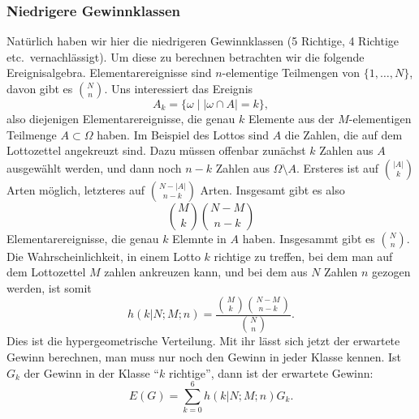 \subsubsection{Niedrigere Gewinnklassen}
Natürlich
haben wir hier die niedrigeren Gewinnklassen (5 Richtige, 4 Richtige
etc.~vernachlässigt).
Um diese zu berechnen betrachten wir die folgende
Ereignisalgebra.
Elementarereignisse sind $n$-elementige Teilmengen von
$\{1,\dots,N\}$, davon gibt es $\binom{N}{n}$.
Uns interessiert das Ereignis
\[
A_k=\{\omega\;|\;|\omega\cap A|=k\},
\]
also diejenigen Elementarereignisse, die genau $k$ Elemente aus der
$M$-elementigen Teilmenge
$A\subset\Omega$ haben.
Im Beispiel des Lottos sind $A$ die Zahlen, die
auf dem Lottozettel angekreuzt sind.
Dazu müssen offenbar zunächst $k$ Zahlen aus $A$ ausgewählt werden,
und dann noch $n-k$ Zahlen aus $\Omega\setminus A$.
Ersteres ist
auf $\binom{|A|}{k}$ Arten möglich, letzteres auf $\binom{N-|A|}{n-k}$
Arten.
Insgesamt gibt es also 
\[
\binom{M}{k}\binom{N-M}{n-k}
\]
Elementarereignisse, die genau $k$ Elemnte in $A$ haben.
Insgesammt gibt es $\binom{N}{n}$.
Die Wahrscheinlichkeit,
in einem Lotto $k$ richtige
zu treffen, bei dem man auf dem Lottozettel $M$ zahlen ankreuzen kann,
und bei dem aus $N$ Zahlen $n$ gezogen werden, ist somit
\begin{equation}
h(k|N;M;n)=\frac{\binom{M}{k}\binom{N-M}{n-k}}{\binom{N}{n}}.
\label{hypergeometrische-verteilung}
\end{equation}
Dies ist die hypergeometrische Verteilung.
Mit ihr lässt sich jetzt der erwartete
Gewinn berechnen, man muss nur noch den Gewinn in jeder Klasse kennen.
Ist $G_k$ der Gewinn in der Klasse ``$k$ richtige'', dann ist der
erwartete Gewinn:
\[
E(G)=\sum_{k=0}^{6}h(k|N;M;n)G_k.
\]

